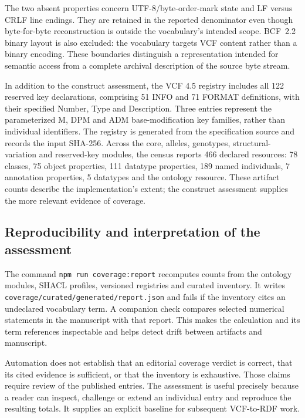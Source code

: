 \documentclass{ceurart}
\newcommand{\term}[1]{\texttt{#1}}
\begin{document}
The two absent properties concern UTF-8/byte-order-mark state and LF versus CRLF line endings. They are retained in the reported denominator even though byte-for-byte reconstruction is outside the vocabulary's intended scope. BCF~2.2 binary layout is also excluded: the vocabulary targets VCF content rather than a binary encoding. These boundaries distinguish a representation intended for semantic access from a complete archival description of the source byte stream.

In addition to the construct assessment, the VCF 4.5 registry includes all 122 reserved key declarations, comprising 51 INFO and 71 FORMAT definitions, with their specified Number, Type and Description. Three entries represent the parameterized M, DPM and ADM base-modification key families, rather than individual identifiers. The registry is generated from the specification source and records the input SHA-256. Across the core, alleles, genotypes, structural-variation and reserved-key modules, the census reports 466 declared resources: 78 classes, 75 object properties, 111 datatype properties, 189 named individuals, 7 annotation properties, 5 datatypes and the ontology resource. These artifact counts describe the implementation's extent; the construct assessment supplies the more relevant evidence of coverage.

\subsection{Reproducibility and interpretation of the assessment}

The command \term{npm run coverage:report} recomputes counts from the ontology modules, SHACL profiles, versioned registries and curated inventory. It writes \term{coverage/curated/generated/report.json} and fails if the inventory cites an undeclared vocabulary term. A companion check compares selected numerical statements in the manuscript with that report. This makes the calculation and its term references inspectable and helps detect drift between artifacts and manuscript.

Automation does not establish that an editorial coverage verdict is correct, that its cited evidence is sufficient, or that the inventory is exhaustive. Those claims require review of the published entries. The assessment is useful precisely because a reader can inspect, challenge or extend an individual entry and reproduce the resulting totals. It supplies an explicit baseline for subsequent VCF-to-RDF work.
\end{document}
